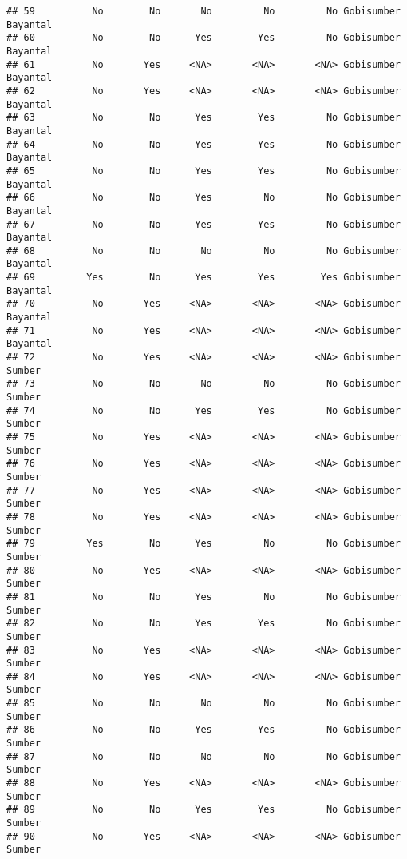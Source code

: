 \documentclass[
]{article}
\begin{document}
\begin{verbatim}
## 59          No        No       No         No         No Gobisumber     Bayantal
## 60          No        No      Yes        Yes         No Gobisumber     Bayantal
## 61          No       Yes     <NA>       <NA>       <NA> Gobisumber     Bayantal
## 62          No       Yes     <NA>       <NA>       <NA> Gobisumber     Bayantal
## 63          No        No      Yes        Yes         No Gobisumber     Bayantal
## 64          No        No      Yes        Yes         No Gobisumber     Bayantal
## 65          No        No      Yes        Yes         No Gobisumber     Bayantal
## 66          No        No      Yes         No         No Gobisumber     Bayantal
## 67          No        No      Yes        Yes         No Gobisumber     Bayantal
## 68          No        No       No         No         No Gobisumber     Bayantal
## 69         Yes        No      Yes        Yes        Yes Gobisumber     Bayantal
## 70          No       Yes     <NA>       <NA>       <NA> Gobisumber     Bayantal
## 71          No       Yes     <NA>       <NA>       <NA> Gobisumber     Bayantal
## 72          No       Yes     <NA>       <NA>       <NA> Gobisumber       Sumber
## 73          No        No       No         No         No Gobisumber       Sumber
## 74          No        No      Yes        Yes         No Gobisumber       Sumber
## 75          No       Yes     <NA>       <NA>       <NA> Gobisumber       Sumber
## 76          No       Yes     <NA>       <NA>       <NA> Gobisumber       Sumber
## 77          No       Yes     <NA>       <NA>       <NA> Gobisumber       Sumber
## 78          No       Yes     <NA>       <NA>       <NA> Gobisumber       Sumber
## 79         Yes        No      Yes         No         No Gobisumber       Sumber
## 80          No       Yes     <NA>       <NA>       <NA> Gobisumber       Sumber
## 81          No        No      Yes         No         No Gobisumber       Sumber
## 82          No        No      Yes        Yes         No Gobisumber       Sumber
## 83          No       Yes     <NA>       <NA>       <NA> Gobisumber       Sumber
## 84          No       Yes     <NA>       <NA>       <NA> Gobisumber       Sumber
## 85          No        No       No         No         No Gobisumber       Sumber
## 86          No        No      Yes        Yes         No Gobisumber       Sumber
## 87          No        No       No         No         No Gobisumber       Sumber
## 88          No       Yes     <NA>       <NA>       <NA> Gobisumber       Sumber
## 89          No        No      Yes        Yes         No Gobisumber       Sumber
## 90          No       Yes     <NA>       <NA>       <NA> Gobisumber       Sumber

\end{verbatim}
\end{document}
